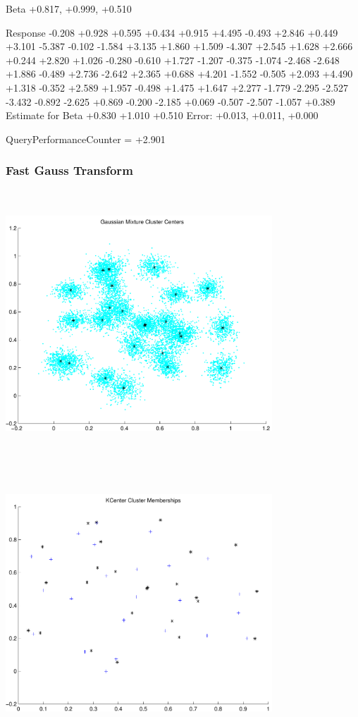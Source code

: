 \documentclass[9pt]{article}
\theoremstyle{plain}
\theoremstyle{definition}
\theoremstyle{remark}
\numberwithin{equation}{section}
\begin{document}
Beta
+0.817, +0.999, +0.510

Response
-0.208
+0.928
+0.595
+0.434
+0.915
+4.495
-0.493
+2.846
+0.449
+3.101
-5.387
-0.102
-1.584
+3.135
+1.860
+1.509
-4.307
+2.545
+1.628
+2.666
+0.244
+2.820
+1.026
-0.280
-0.610
+1.727
-1.207
-0.375
-1.074
-2.468
-2.648
+1.886
-0.489
+2.736
-2.642
+2.365
+0.688
+4.201
-1.552
-0.505
+2.093
+4.490
+1.318
-0.352
+2.589
+1.957
-0.498
+1.475
+1.647
+2.277
-1.779
-2.295
-2.527
-3.432
-0.892
-2.625
+0.869
-0.200
-2.185
+0.069
-0.507
-2.507
-1.057
+0.389
Estimate for Beta
+0.830
+1.010
+0.510
Error:
+0.013, +0.011, +0.000


QueryPerformanceCounter  =  +2.901
\subsubsection{Fast Gauss Transform}
\includegraphics[width=10.0cm,height=10.0cm]{GaussianMixture_ClusterCenters25_Centers.pdf}

\includegraphics[width=10.0cm,height=10.0cm]{KCenterClusterMemberships_25_Centers.pdf}
\end{document}
